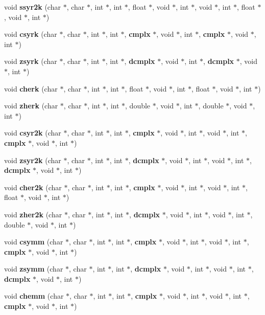 \begin{CompactItemize}
\item 
void {\bf ssyr2k} (char $\ast$, char $\ast$, int $\ast$, int $\ast$, float $\ast$, void $\ast$, int $\ast$, void $\ast$, int $\ast$, float $\ast$, void $\ast$, int $\ast$)
\item 
void {\bf csyrk} (char $\ast$, char $\ast$, int $\ast$, int $\ast$, {\bf cmplx} $\ast$, void $\ast$, int $\ast$, {\bf cmplx} $\ast$, void $\ast$, int $\ast$)
\item 
void {\bf zsyrk} (char $\ast$, char $\ast$, int $\ast$, int $\ast$, {\bf dcmplx} $\ast$, void $\ast$, int $\ast$, {\bf dcmplx} $\ast$, void $\ast$, int $\ast$)
\item 
void {\bf cherk} (char $\ast$, char $\ast$, int $\ast$, int $\ast$, float $\ast$, void $\ast$, int $\ast$, float $\ast$, void $\ast$, int $\ast$)
\item 
void {\bf zherk} (char $\ast$, char $\ast$, int $\ast$, int $\ast$, double $\ast$, void $\ast$, int $\ast$, double $\ast$, void $\ast$, int $\ast$)
\item 
void {\bf csyr2k} (char $\ast$, char $\ast$, int $\ast$, int $\ast$, {\bf cmplx} $\ast$, void $\ast$, int $\ast$, void $\ast$, int $\ast$, {\bf cmplx} $\ast$, void $\ast$, int $\ast$)
\item 
void {\bf zsyr2k} (char $\ast$, char $\ast$, int $\ast$, int $\ast$, {\bf dcmplx} $\ast$, void $\ast$, int $\ast$, void $\ast$, int $\ast$, {\bf dcmplx} $\ast$, void $\ast$, int $\ast$)
\item 
void {\bf cher2k} (char $\ast$, char $\ast$, int $\ast$, int $\ast$, {\bf cmplx} $\ast$, void $\ast$, int $\ast$, void $\ast$, int $\ast$, float $\ast$, void $\ast$, int $\ast$)
\item 
void {\bf zher2k} (char $\ast$, char $\ast$, int $\ast$, int $\ast$, {\bf dcmplx} $\ast$, void $\ast$, int $\ast$, void $\ast$, int $\ast$, double $\ast$, void $\ast$, int $\ast$)
\item 
void {\bf csymm} (char $\ast$, char $\ast$, int $\ast$, int $\ast$, {\bf cmplx} $\ast$, void $\ast$, int $\ast$, void $\ast$, int $\ast$, {\bf cmplx} $\ast$, void $\ast$, int $\ast$)
\item 
void {\bf zsymm} (char $\ast$, char $\ast$, int $\ast$, int $\ast$, {\bf dcmplx} $\ast$, void $\ast$, int $\ast$, void $\ast$, int $\ast$, {\bf dcmplx} $\ast$, void $\ast$, int $\ast$)
\item 
void {\bf chemm} (char $\ast$, char $\ast$, int $\ast$, int $\ast$, {\bf cmplx} $\ast$, void $\ast$, int $\ast$, void $\ast$, int $\ast$, {\bf cmplx} $\ast$, void $\ast$, int $\ast$)

\end{CompactItemize}
